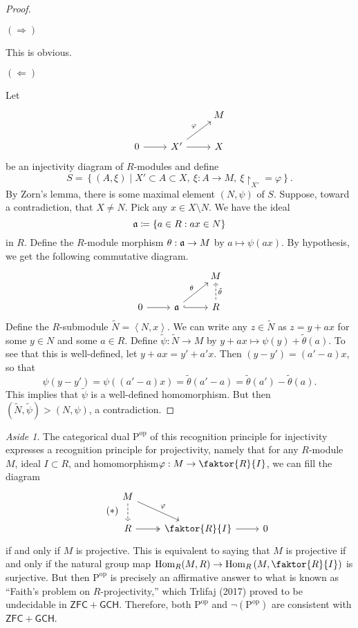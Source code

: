 \documentclass[10pt,letterpaper,cm]{nupset}
\theoremstyle{definition}
\theoremstyle{theorem}
\theoremstyle{remark}
\newtheorem*{aside}{Aside}
\newcommand{\1}{\mathbf{1}}
\newcommand{\0}{\vec 0}
\newcommand{\Rho}{\mathrm{P}}
\DeclareMathOperator{\op}{op}
\DeclareMathOperator{\Hom}{Hom}
\begin{document}
\begin{proof} $ $
\smallskip

$(\Longrightarrow)$

This is obvious.

\medskip


$(\Longleftarrow)$ 

Let 
\[
\begin{tikzcd}
 &  & M \\
0 \arrow[r] & X' \arrow[ru, "\varphi"] \arrow[r] & X
\end{tikzcd} \] 
be an injectivity diagram of $R$-modules and define $$S = \left\{(A, \xi) \mid X' \subset A \subset X, \ \xi : A \to M, \ \xi \restriction_{X'} = \varphi\right\} . $$ By Zorn's lemma, there is some maximal element $\left(N, \psi\right)$ of $S$. Suppose, toward a contradiction, that $X \ne N$. Pick any $x\in X \setminus N$. We have the ideal $$\frak{a} \coloneqq  \left\{a \in R : ax \in N\right\}$$ in $R$. Define the $R$-module morphism $\theta : \frak{a} \to M$ by $a \mapsto \psi(ax)$. By hypothesis, we get the following commutative diagram.
\[
\begin{tikzcd}
 &  & M \\
0 \arrow[r] & \frak{a} \arrow[ru, "\theta"] \arrow[r, hook] & R \arrow[u, "\tilde{\theta}"', dashed]
\end{tikzcd}
\] Define the $R$-submodule $\widetilde{N} = \left\langle N, x\right\rangle$. We can write any $z\in \widetilde{N}$ as $z = y + ax$ for some $y\in N$ and some $a\in R$. Define $\tilde{\psi} : \widetilde{N} \to M$ by $y+ax \mapsto \psi(y) + \tilde{\theta}(a)$. To see that this is well-defined, let $y+ax = y'+a'x$. Then $\left(y-y'\right) = \left(a'-a\right)x$, so that $$\psi(y-y') = \psi(\left(a'-a\right)x) = \tilde{\theta}\left(a'-a\right) = \tilde{\theta}(a') - \tilde{\theta}(a) . $$
This implies that $\tilde{\psi}$ is a well-defined homomorphism. But then $\left(\widetilde{N}, \tilde{\psi}\right)> \left(N, \psi\right)$, a contradiction.  
\end{proof}

\begin{aside}
The categorical dual $\Rho^{\op}$ of this recognition principle for injectivity expresses a recognition principle for projectivity, namely that for any $R$-module $M$, ideal $I\subset R$, and homomorphism\linebreak $\varphi : M \to \faktor{R}{I}$, we can fill the diagram
\[ \tag{$\ast$}
\begin{tikzcd}
M \arrow[rd, "\varphi"] \arrow[d, dashed] &  &  \\
R \arrow[r, two heads] & \faktor{R}{I} \arrow[r] & 0
\end{tikzcd}
\] if and only if $M$ is projective. This is equivalent to saying that $M$ is projective if and only if the natural group map $\Hom_R(M, R) \to \Hom_R \left(M, \faktor{R}{I} \right)$ is surjective. 
But then $\Rho^{\op}$ is precisely an affirmative answer to what is known as ``Faith's problem on $R$-projectivity,'' which Trlifaj (2017) proved to be undecidable in $\mathsf{ZFC} + \mathsf{GCH}$. Therefore, both $\Rho^{\op}$ and $\neg (\Rho^{\op})$ are consistent with $\mathsf{ZFC} + \mathsf{GCH}$.
\end{aside}
\end{document}
